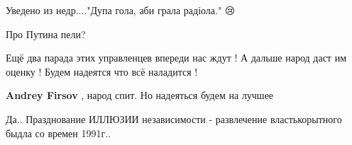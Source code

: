 \begin{itemize}
\begin{itemize}
 
Уведено из недр...."Дупа гола, аби грала радіола." 😢

\end{itemize}

 
Про Путина пели?

 
Ещё два парада этих управленцев впереди нас ждут ! А дальше народ даст им оценку ! Будем надеятся что всё наладится !

\begin{itemize}
 
\textbf{Andrey Firsov} , народ спит. Но надеяться будем на лучшее
\end{itemize}

 
Да.. Празднование ИЛЛЮЗИИ независимости - развлечение властькорытного быдла со
времен 1991г..

\end{itemize}

